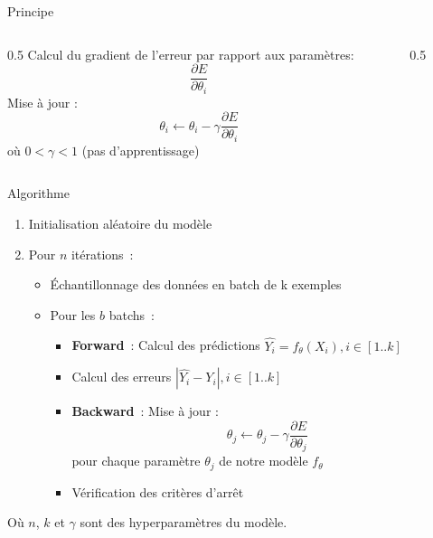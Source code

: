 
\begin{frame}{Principe}
  \begin{columns}
    \begin{column}{0.5\tw}
      Calcul du gradient de l'erreur par rapport aux paramètres:
      \[
        \frac{\partial{E}}{\partial{\theta_i}}
      \]
      Mise à jour :
      \[
        \theta_i \leftarrow \theta_i - \gamma\frac{\partial{E}}{\partial{\theta_i}}
      \]
      où $0 < \gamma < 1$ (pas d'apprentissage)
    \end{column}
    \begin{column}{0.5\tw}
    \end{column}
  \end{columns}
\end{frame}

\begin{frame}{Algorithme}
  \begin{enumerate}[<+->]
    \item Initialisation aléatoire du modèle
    \item Pour $n$ itérations~:
      \begin{itemize}
        \item Échantillonnage des données en batch de k exemples
        \item Pour les $b$ batchs~:
        \begin{itemize}
          \item \textbf{Forward}~: Calcul des prédictions $\hat{Y_i} = f_{\theta}(X_i), i\in[1..k]$
          \item Calcul des erreurs $|\hat{Y_i}-Y_i|, i\in[1..k]$
          \item \textbf{Backward}~: Mise à jour :
          \[
            \theta_j \leftarrow \theta_j - \gamma\frac{\partial{E}}{\partial{\theta_j}}
          \]
          pour chaque paramètre $\theta_j$ de notre modèle $f_\theta$ \\$\,$

          \item Vérification des critères d'arrêt
        \end{itemize}
      \end{itemize}
  \end{enumerate}

  Où $n$, $k$ et $\gamma$ sont des hyperparamètres du modèle.
\end{frame}


